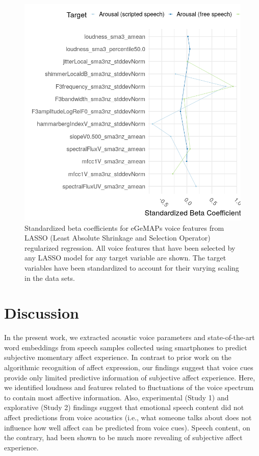 \documentclass[
  english,
  man,floatsintext]{apa6}
\begin{document}
\begin{figure}

{\centering \includegraphics[width=1\linewidth,height=1\textheight]{../figures/betas_plot} 

}

\caption[LASSO betas]{Standardized beta coefficients for eGeMAPs voice features from LASSO (Least Absolute Shrinkage and Selection Operator) regularized regression. All voice features that have been selected by any LASSO model for any target variable are shown. The target variables have been standardized to account for their varying scaling in the data sets.}\label{fig:lassobetas}
\end{figure}

\newpage

\hypertarget{discussion}{%
\section{Discussion}\label{discussion}}

In the present work, we extracted acoustic voice parameters and state-of-the-art word embeddings from speech samples collected using smartphones to predict subjective momentary affect experience. In contrast to prior work on the algorithmic recognition of affect expression, our findings suggest that voice cues provide only limited predictive information of subjective affect experience. Here, we identified loudness and features related to fluctuations of the voice spectrum to contain most affective information. Also, experimental (Study 1) and explorative (Study 2) findings suggest that emotional speech content did not affect predictions from voice acoustics (i.e., what someone talks about does not influence how well affect can be predicted from voice cues). Speech content, on the contrary, had been shown to be much more revealing of subjective affect experience.
\end{document}
